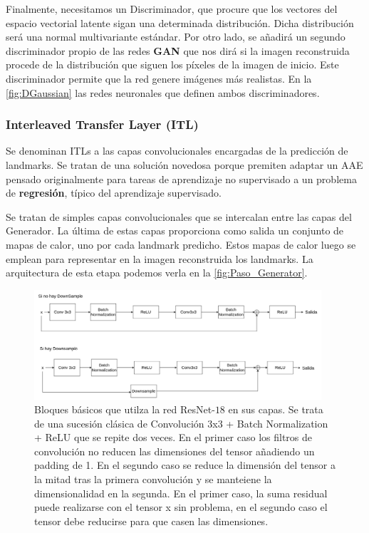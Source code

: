             \medskip

            \noindent Finalmente, necesitamos un Discriminador, que procure que los vectores del espacio vectorial latente sigan una determinada distribución. Dicha distribución será una normal multivariante estándar. Por otro lado, se añadirá un segundo discriminador propio de las redes \textbf{GAN} que nos dirá si la imagen reconstruida procede de la distribución que siguen los píxeles de la imagen de inicio. Este discriminador permite que la red genere imágenes más realistas. En la \autoref{fig:DGaussian} las redes neuronales que definen ambos discriminadores.

            \subsubsection{Interleaved Transfer Layer (ITL)}
                \noindent Se denominan ITLs a las capas convolucionales encargadas de la predicción de landmarks. Se tratan de una solución novedosa porque premiten adaptar un AAE pensado originalmente para tareas de aprendizaje no supervisado a un problema de \textbf{regresión}, típico del aprendizaje supervisado.

                \medskip
                
                \noindent Se tratan de simples capas convolucionales que se intercalan entre las capas del Generador. La última de estas capas proporciona como salida un conjunto de mapas de calor, uno por cada landmark predicho. Estos mapas de calor luego se emplean para representar en la imagen reconstruida los landmarks. La arquitectura de esta etapa podemos verla en la \autoref{fig:Paso_Generator}.

            \begin{figure}[h]
                \centering
                \includegraphics[width=0.95\textwidth]{img/bloque_basico_encoder.png}
                \caption{Bloques básicos que utilza la red ResNet-$18$ en sus capas. Se trata de una sucesión clásica de Convolución 3x3 + Batch Normalization + ReLU que se repite dos veces. En el primer caso los filtros de convolución no reducen las dimensiones del tensor añadiendo un padding de 1. En el segundo caso se reduce la dimensión del tensor a la mitad tras la primera convolución y se manteiene la dimensionalidad en la segunda. En el primer caso, la suma residual puede realizarse con el tensor x sin problema, en el segundo caso el tensor debe reducirse para que casen las dimensiones.}
                \label{fig:bloque_encoder}
            \end{figure}

